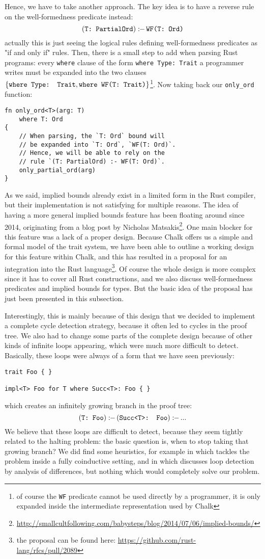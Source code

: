 \documentclass[twocolumn]{article}
\newcommand{\rust}[1]{\texttt{#1}}
\newcommand{\mrust}[1]{\text{\rust{#1}}}
\newcommand{\pif}[0]{:\!\!-\,}
\begin{document}
Hence, we have to take another approach. The key idea is to have a reverse rule on the well-formedness predicate instead:
\[
    (\mrust{T: PartialOrd}) \pif \mrust{WF(T: Ord)}
\]
actually this is just seeing the logical rules defining well-formedness predicates as "if and only if" rules. Then, there is a small step to add when parsing Rust programs: every \rust{where} clause of the form \rust{where Type: Trait} a programmer writes must be expanded into the two clauses $\{\mrust{where Type: Trait}, \mrust{where WF(T: Trait)}\}$\footnote{of course the \rust{WF} predicate cannot be used directly by a programmer, it is only expanded inside the intermediate representation used by Chalk}. Now taking back our \rust{only_ord} function:
\begin{verbatim}
fn only_ord<T>(arg: T)
    where T: Ord
{
    // When parsing, the `T: Ord` bound will
    // be expanded into `T: Ord`, `WF(T: Ord)`.
    // Hence, we will be able to rely on the
    // rule `(T: PartialOrd) :- WF(T: Ord)`.
    only_partial_ord(arg)
}
\end{verbatim}

As we said, implied bounds already exist in a limited form in the Rust compiler, but their implementation is not satisfying for multiple reasons. The idea of having a more general implied bounds feature has been floating around since 2014, originating from a blog post by Nicholas Matsakis\footnote{\url{http://smallcultfollowing.com/babysteps/blog/2014/07/06/implied-bounds/}}. One main blocker for this feature was a lack of a proper design. Because Chalk offers us a simple and formal model of the trait system, we have been able to outline a working design for this feature within Chalk, and this has resulted in a proposal for an integration into the Rust language\footnote{the proposal can be found here: \url{https://github.com/rust-lang/rfcs/pull/2089}}. Of course the whole design is more complex since it has to cover all Rust constructions, and we also discuss well-formedness predicates and implied bounds for types. But the basic idea of the proposal has just been presented in this subsection.

Interestingly, this is mainly because of this design that we decided to implement a complete cycle detection strategy, because it often led to cycles in the proof tree. We also had to change some parts of the complete design because of other kinds of infinite loops appearing, which were much more difficult to detect. Basically, these loops were always of a form that we have seen previously:
\begin{verbatim}
trait Foo { }

impl<T> Foo for T where Succ<T>: Foo { }
\end{verbatim}
which creates an infinitely growing branch in the proof tree:
\[
    (\mrust{T: Foo}) \pif (\mrust{Succ<T>: Foo}) \pif ...
\]
We believe that these loops are difficult to detect, because they seem tightly related to the halting problem: the basic question is, when to stop taking that growing branch? We did find some heuristics, for example in \cite{growing} which tackles the problem inside a fully coinductive setting, and in \cite{kowalski} which discusses loop detection by analysis of differences, but nothing which would completely solve our problem.
\end{document}
